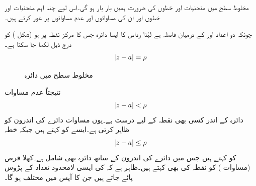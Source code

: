 مخلوط سطح  میں منحنیات اور خطوں کی ضرورت ہمیں بار بار ہو گی۔اس لیے چند اہم منحنیات اور خطوں اور ان کی مساواتوں اور عدم مساواتوں  پر غور کرتے ہیں۔

چونکہ دو اعداد  اور  کے درمیان فاصلہ  ہے لہٰذا رداس  کا ایسا دائرہ  جس کا مرکز نقطہ  پر ہو (شکل ) کو درج ذیل لکھا جا سکتا ہے۔
\begin{align}\label{مساوات_مخلوط_سطح_دائرہ_الف}
\abs{z-a}=\rho
\end{align} 
%
\begin{figure}
\centering
{}
\caption{مخلوط سطح میں دائرہ}
\label{شکل_مخلوط_سطح_دائرہ}
\end{figure}

نتیجتاً عدم مساوات
\begin{align}\label{مساوات_مخلوط_سطح_دائرہ_ب}
\abs{z-a}<\rho
\end{align}
دائرہ  کے اندر کسی بھی نقطہ کے لیے درست ہے۔یوں مساوات  دائرے کی اندرون کو ظاہر کرتی ہے۔ایسے   کو  کہتے ہیں جبکہ خطہ
\begin{align}\label{مساوات_مخلوط_سطح_دائرہ_پ}
\abs{z-a}\le \rho
\end{align}
کو  کہتے ہیں جس میں دائرے کی اندرون کے ساتھ دائرہ بھی شامل ہے۔کھلا قرص  (مساوات ) کو نقطہ  کی  بھی کہتے ہیں۔ظاہر ہے کہ  کی ایسی لامحدود تعداد کے پڑوس پائے جاتے ہیں جن کا  آپس میں مختلف ہو گا۔

